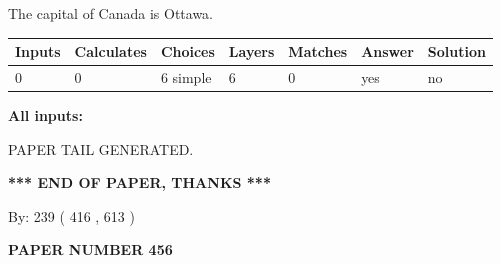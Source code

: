 \documentclass[12pt]{article}
\begin{document}
 
The capital of Canada is Ottawa.
 
 
\noindent{}
 
 
   
   
   
   
\noindent\begin{tabular}{|l|l|l|l|l|l|l|}
 \hline
Inputs & Calculates & Choices & Layers & Matches & Answer & Solution \\ \hline
 0  & 
 0  & 
 6
  simple  
  & 
 6  & 
 0  & 
  yes & 
  no 
  \\ \hline
 \end{tabular}
   
   
   
   
\noindent{}
   
   
   
   
\noindent\vspace{0.1in}\hspace{-0.08in} {\textbf{\Large{All inputs: }}}
   
   
   
   
   
   
 \vspace{0.2in}
 
   
   
\vspace{2.0in} PAPER TAIL GENERATED.
   
   
   
   
\vspace{1.0in} 
{\textbf{\large{ *** END OF PAPER, THANKS *** }}} 
   
   
\hspace{1.0in} By: 
 239 ( 416 ,  613 )
   
   
   
   
\newpage 
\setcounter{page}{ 
   456001 } 
   
   
   
   
 {\textbf{ \Large{ PAPER NUMBER  456  }}}
   
   
\vspace{0.2in}
   
   
   
   
   
   
   
\end{document}
